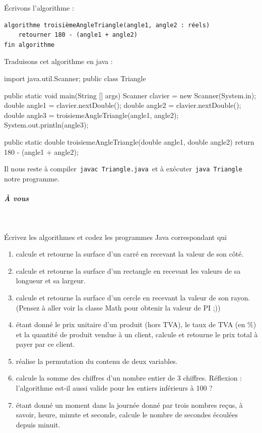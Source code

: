 \documentclass[11pt,a4paper]{article}
\begin{document}
          \'Ecrivons l'algorithme :
          \begin{verbatim}
algorithme troisièmeAngleTriangle(angle1, angle2 : réels)
    retourner 180 - (angle1 + angle2)
fin algorithme
          \end{verbatim}
          Traduisons cet algorithme en java :
          \begin{Java}
import java.util.Scanner;
public class Triangle{
    public static void main(String [] args) {
        Scanner clavier = new Scanner(System.in);
        double angle1 = clavier.nextDouble();
        double angle2 = clavier.nextDouble();
        double angle3 = troisiemeAngleTriangle(angle1, angle2);
        System.out.println(angle3);
    }    
    
    public static double troisiemeAngleTriangle(double angle1, double angle2) {
        return 180 - (angle1 + angle2);
    }
}
        \end{Java}
        Il nous reste \`a compiler \,\verb|javac Triangle.java|\, et \`a ex\'ecuter \,\verb|java Triangle|\, notre programme.
        
            \par
        
			
		\subparagraph{\`A vous} 
		
					\textcolor{white}{.} \par
				
        \'Ecrivez les algorithmes et codez les programmes Java correspondant qui 
          
					\begin{enumerate}
				
			\item calcule et retourne la surface d'un carr\'e en recevant la valeur de son c\^ot\'e.
			\item calcule et retourne la surface d'un rectangle en recevant les valeurs de sa longueur et sa largeur.
			\item calcule et retourne la surface d'un cercle en recevant la valeur de son rayon.  (Pensez \`a aller voir la classe Math pour obtenir la valeur de PI ;))
			\item \'etant donn\'e le prix unitaire d'un produit (hors TVA), le taux de TVA (en \%) 
            et la quantit\'e de produit vendue \`a un client, calcule et retourne le prix total \`a payer par ce client.
			\item r\'ealise la permutation du contenu de deux variables.
			\item calcule la somme des chiffres d'un nombre entier de 3 chiffres. R\'eflexion : l'algorithme est-il aussi valide pour les entiers inf\'erieurs \`a 100 ?
			\item \'etant donn\'e un moment dans la journ\'ee donn\'e par trois nombres re\c cus, \`a savoir, heure, minute et seconde, calcule le nombre de secondes \'ecoul\'ees depuis minuit.
					\end{enumerate}
				
            \par
        
				
\end{document}
